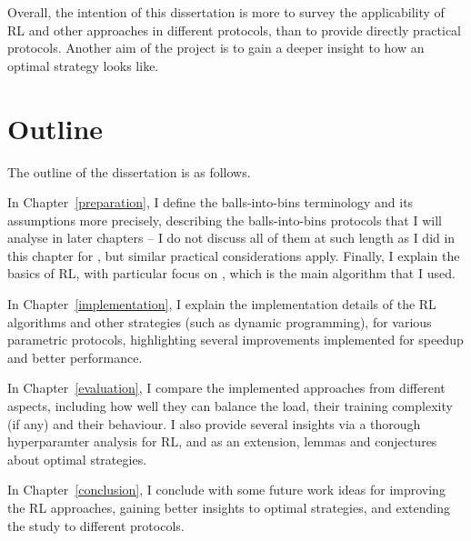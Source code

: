 Overall, the intention of this dissertation is more to survey the applicability of RL and other approaches in different protocols, than to provide directly practical protocols. Another aim of the project is to gain a deeper insight to how an optimal strategy looks like.




\section{Outline}

The outline of the dissertation is as follows.


In Chapter~\ref{preparation}, I define the balls-into-bins terminology and its assumptions more precisely, describing the balls-into-bins protocols that I will analyse in later chapters -- I do not discuss all of them at such length as I did in this chapter for \TwoThinning, but similar practical considerations apply. Finally, I explain the basics of RL, with particular focus on \DQL, which is the main algorithm that I used.


In Chapter~\ref{implementation}, I explain the implementation details of the RL algorithms and other strategies (such as dynamic programming), for various parametric protocols, highlighting several improvements implemented for speedup and better performance.


In Chapter~\ref{evaluation}, I compare the implemented approaches from different aspects, including how well they can balance the load, their training complexity (if any) and their behaviour. I also provide several insights via a thorough hyperparamter analysis for RL, and as an extension, lemmas and conjectures about optimal strategies.

In Chapter~\ref{conclusion}, I conclude with some future work ideas for improving the RL approaches, gaining better insights to optimal strategies, and extending the study to different protocols.